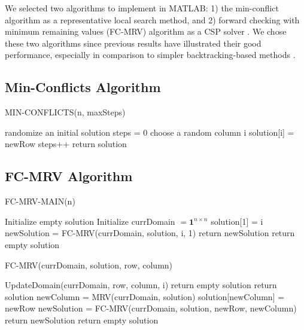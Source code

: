 We selected two algorithms to implement in MATLAB: 1) the min-conflict algorithm as a representative local search method, and 2) forward checking with minimum remaining values (FC-MRV) algorithm as a CSP solver \citep{aima}. We chose these two algorithms since previous results have illustrated their good performance, especially in comparison to simpler backtracking-based methods \citep{aima}.

\subsection{Min-Conflicts Algorithm}

\begin{algorithm}
\caption{MIN-CONFLICTS(n, maxSteps)}\label{alg:min-conflicts}
\begin{algorithmic}[1]
\State randomize an initial solution
\State steps = 0
\State choose a random column i
\State solution[i] = newRow
\EndIf
\State steps++
\EndWhile
\State return solution
\end{algorithmic}
\end{algorithm}

\subsection{FC-MRV Algorithm}

\begin{algorithm}
\caption{FC-MRV-MAIN(n)}\label{alg:fc-mrv-main}
\begin{algorithmic}[1]
\State Initialize empty solution
\State Initialize currDomain $ = \boldsymbol{1}^{n\times n}$
\State solution[1] = i
\State newSolution = FC-MRV(currDomain, solution, i, 1) 
return newSolution
\EndIf
\EndFor
\State return empty solution
\end{algorithmic}
\end{algorithm}

\begin{algorithm}
\caption{FC-MRV(currDomain, solution, row, column)}\label{alg:fc-mrv}
\begin{algorithmic}[1]
\State UpdateDomain(currDomain, row, column, i)
return empty solution
\EndIf
\EndFor
{}
return solution
\EndIf
\State newColumn = MRV(currDomain, solution)
\State solution[newColumn] = newRow
\State newSolution = FC-MRV(currDomain, solution, newRow, newColumn) 
return newSolution
\EndIf
\EndFor
\State return empty solution
\end{algorithmic}
\end{algorithm}

